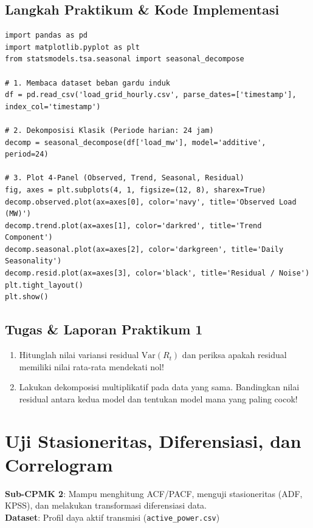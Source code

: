 \documentclass[11pt,a4paper]{report}
\begin{document}
\section{Langkah Praktikum \& Kode Implementasi}
\begin{lstlisting}
import pandas as pd
import matplotlib.pyplot as plt
from statsmodels.tsa.seasonal import seasonal_decompose

# 1. Membaca dataset beban gardu induk
df = pd.read_csv('load_grid_hourly.csv', parse_dates=['timestamp'], index_col='timestamp')

# 2. Dekomposisi Klasik (Periode harian: 24 jam)
decomp = seasonal_decompose(df['load_mw'], model='additive', period=24)

# 3. Plot 4-Panel (Observed, Trend, Seasonal, Residual)
fig, axes = plt.subplots(4, 1, figsize=(12, 8), sharex=True)
decomp.observed.plot(ax=axes[0], color='navy', title='Observed Load (MW)')
decomp.trend.plot(ax=axes[1], color='darkred', title='Trend Component')
decomp.seasonal.plot(ax=axes[2], color='darkgreen', title='Daily Seasonality')
decomp.resid.plot(ax=axes[3], color='black', title='Residual / Noise')
plt.tight_layout()
plt.show()
\end{lstlisting}

\section{Tugas \& Laporan Praktikum 1}
\begin{enumerate}
    \item Hitunglah nilai variansi residual $\mathrm{Var}(R_t)$ dan periksa apakah residual memiliki nilai rata-rata mendekati nol!
    \item Lakukan dekomposisi multiplikatif pada data yang sama. Bandingkan nilai residual antara kedua model dan tentukan model mana yang paling cocok!
\end{enumerate}

\newpage

\chapter{Uji Stasioneritas, Diferensiasi, dan Correlogram}

\begin{tcolorbox}[title=Informasi Modul 2]
\textbf{Sub-CPMK 2}: Mampu menghitung ACF/PACF, menguji stasioneritas (ADF, KPSS), dan melakukan transformasi diferensiasi data.\\
\textbf{Dataset}: Profil daya aktif transmisi (\texttt{active\_power.csv})
\end{tcolorbox}
\end{document}
